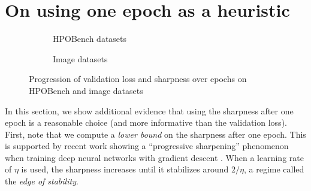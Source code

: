 \section{On using one epoch as a heuristic}

\begin{figure}
    \centering
    \begin{subfigure}[t]{.48\textwidth}
        
        \caption{HPOBench datasets}
    \end{subfigure}
    \begin{subfigure}[t]{.48\textwidth}
        
        \caption{Image datasets}
    \end{subfigure}
    \caption{Progression of validation loss and sharpness over epochs on HPOBench and image datasets}
    \label{fig:sharpness-over-epochs}
\end{figure}




In this section, we show additional evidence that using the sharpness after one epoch is a reasonable choice (and more informative than the validation loss). First, note that we compute a \textit{lower bound} on the sharpness after one epoch. This is supported by recent work showing a ``progressive sharpening'' phenomenon when training deep neural networks with gradient descent \cite{jastrzebskiBreakEvenPointOptimization2020, jastrzebskiRelationSharpestDirections2019, cohenGradientDescentNeural2021}. When a learning rate of $\eta$ is used, the sharpness increases until it stabilizes around $2/\eta$, a regime called the \textit{edge of stability}.


